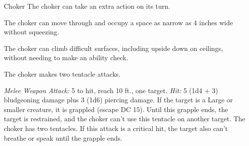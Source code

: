 \documentclass[10pt,a4paper,twoside,bg=print,twocolumn,openany,nodeprecatedcode]{dndbook}
\begin{document}
\begin{DndMonster}[float=t]{Choker}
\DndMonsterBasics[
armor-class = {16 (natural armor)},
hit-points = {\DndDice{3d6 + 3}},
speed = {30 ft.}
]
\DndMonsterAbilityScores[
 str = 16,
 dex = 14,
 con = 13,
 int = 4,
 wis = 12,
 cha = 7
]
\DndMonsterDetails[
skills = {Stealth +6},
senses = {darkvision 60 ft., passive perception 11},
languages = {Deep Speech},
challenge = 1,
]
The choker can take an extra action on its turn.

The choker can move through and occupy a space as narrow as 4 inches wide without squeezing.

The choker can climb difficult surfaces, including upside down on ceilings, without needing to make an ability check.

The choker makes two tentacle attacks.

\textsl{Melee Weapon Attack:} 5 to hit, reach 10 ft., one target. \textsl{Hit:} 5 (1d4 + 3) bludgeoning damage plus 3 (1d6) piercing damage. If the target is a Large or smaller creature, it is grappled (escape DC 15). Until this grapple ends, the target is restrained, and the choker can't use this tentacle on another target. The choker has two tentacles. If this attack is a critical hit, the target also can't breathe or speak until the grapple ends.

\end{DndMonster}
\end{document}
